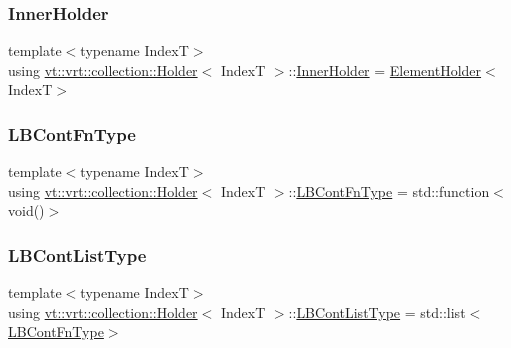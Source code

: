 \mbox{\label{structvt_1_1vrt_1_1collection_1_1_holder_a6c93d243ae88f38a8c5f8aa3a1ad86d8}} 
\subsubsection{\texorpdfstring{Inner\+Holder}{InnerHolder}}
{\footnotesize\ttfamily template$<$typename IndexT$>$ \\
using \hyperlink{structvt_1_1vrt_1_1collection_1_1_holder}{vt\+::vrt\+::collection\+::\+Holder}$<$ IndexT $>$\+::\hyperlink{structvt_1_1vrt_1_1collection_1_1_holder_a6c93d243ae88f38a8c5f8aa3a1ad86d8}{Inner\+Holder} =  \hyperlink{structvt_1_1vrt_1_1collection_1_1_element_holder}{Element\+Holder}$<$IndexT$>$}

\mbox{\label{structvt_1_1vrt_1_1collection_1_1_holder_a1f897dfd5f4e29e997533aeefe7b252d}} 
\subsubsection{\texorpdfstring{L\+B\+Cont\+Fn\+Type}{LBContFnType}}
{\footnotesize\ttfamily template$<$typename IndexT$>$ \\
using \hyperlink{structvt_1_1vrt_1_1collection_1_1_holder}{vt\+::vrt\+::collection\+::\+Holder}$<$ IndexT $>$\+::\hyperlink{structvt_1_1vrt_1_1collection_1_1_holder_a1f897dfd5f4e29e997533aeefe7b252d}{L\+B\+Cont\+Fn\+Type} =  std\+::function$<$void()$>$}

\mbox{\label{structvt_1_1vrt_1_1collection_1_1_holder_a4a738b6b6c2216d7a5b528956502172a}} 
\subsubsection{\texorpdfstring{L\+B\+Cont\+List\+Type}{LBContListType}}
{\footnotesize\ttfamily template$<$typename IndexT$>$ \\
using \hyperlink{structvt_1_1vrt_1_1collection_1_1_holder}{vt\+::vrt\+::collection\+::\+Holder}$<$ IndexT $>$\+::\hyperlink{structvt_1_1vrt_1_1collection_1_1_holder_a4a738b6b6c2216d7a5b528956502172a}{L\+B\+Cont\+List\+Type} =  std\+::list$<$\hyperlink{structvt_1_1vrt_1_1collection_1_1_holder_a1f897dfd5f4e29e997533aeefe7b252d}{L\+B\+Cont\+Fn\+Type}$>$}

